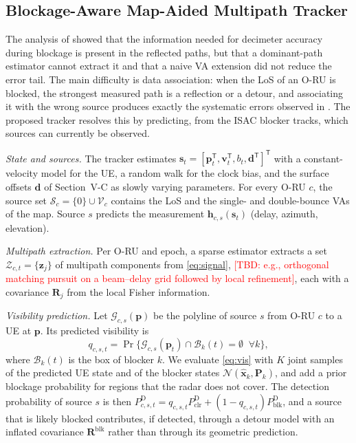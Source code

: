 \documentclass[journal]{IEEEtran}
\newcommand{\tbd}[1]{\textcolor{red}{[TBD: #1]}}
\newenvironment{proposed}{\color{propcol}}{}
\begin{document}
\begin{proposed}
\subsection{Blockage-Aware Map-Aided Multipath Tracker}
The analysis of \cite{natanzi2027wcncB} showed that the information
needed for decimeter accuracy during blockage is present in the
reflected paths, but that a dominant-path estimator cannot extract it
and that a naive VA extension did not reduce the error tail. The main
difficulty is data association: when the LoS of an O-RU is blocked, the
strongest measured path is a reflection or a detour, and associating it
with the wrong source produces exactly the systematic errors observed in
\cite{natanzi2027wcncB}. The proposed tracker resolves this by
predicting, from the ISAC blocker tracks, which sources can currently be
observed.

\textit{State and sources.} The tracker estimates
$\mathbf s_t=[\mathbf p_t^{\mathsf T},\mathbf v_t^{\mathsf T},b_t,\mathbf d^{\mathsf T}]^{\mathsf T}$
with a constant-velocity model for the UE, a random walk for the clock
bias, and the surface offsets $\mathbf d$ of Section~V-C as slowly
varying parameters. For every O-RU $c$, the source set
$\mathcal S_c=\{0\}\cup\mathcal V_c$ contains the LoS and the single- and
double-bounce VAs of the map. Source $s$ predicts the measurement
$\mathbf h_{c,s}(\mathbf s_t)$ (delay, azimuth, elevation).

\textit{Multipath extraction.} Per O-RU and epoch, a sparse estimator
extracts a set $\mathcal Z_{c,t}=\{\mathbf z_j\}$ of multipath components
from \eqref{eq:signal}, \tbd{e.g., orthogonal matching pursuit on a
beam--delay grid followed by local refinement}, each with a covariance
$\mathbf R_j$ from the local Fisher information.

\textit{Visibility prediction.} Let $\mathcal G_{c,s}(\mathbf p)$ be the
polyline of source $s$ from O-RU $c$ to a UE at $\mathbf p$. Its
predicted visibility is
\begin{equation}
q_{c,s,t}=\Pr\bigl\{\mathcal G_{c,s}(\mathbf p_t)\cap\mathcal B_k(t)=\emptyset\;\;\forall k\bigr\},
\label{eq:vis}
\end{equation}
where $\mathcal B_k(t)$ is the box of blocker $k$. We evaluate
\eqref{eq:vis} with $K$ joint samples of the predicted UE state and of
the blocker states $\mathcal N(\hat{\mathbf x}_k,\mathbf P_k)$, and add
a prior blockage probability for regions that the radar does not cover.
The detection probability of source $s$ is then
$P^{\mathrm D}_{c,s,t}=q_{c,s,t}P^{\mathrm D}_{\mathrm{clr}}+(1-q_{c,s,t})P^{\mathrm D}_{\mathrm{blk}}$,
and a source that is likely blocked contributes, if detected, through a
detour model with an inflated covariance $\mathbf R^{\mathrm{blk}}$
rather than through its geometric prediction.


\end{proposed}
\end{document}

